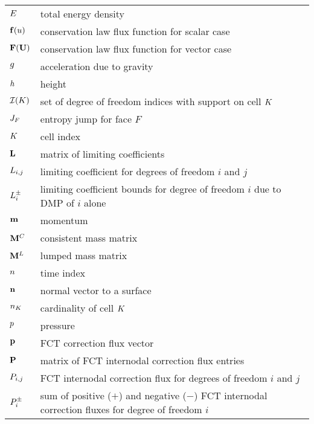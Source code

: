 \begin{center}
\begin{longtable}{l p{4.8in}}
$E$     & total energy density\\
$\mathbf{f}(u)$  & conservation law flux function for scalar case\\
$\consfluxvector$  & conservation law flux function for vector case\\
$g$         & acceleration due to gravity\\
$h$          & height\\
$\mathcal{I}(K)$ & set of degree of freedom indices with support on
                             cell $K$\\
$J_F$ & entropy jump for face $F$\\
$K$       & cell index\\

$\mathbf{L}$   & matrix of limiting coefficients\\
$L_{i,j}$ & limiting coefficient for degrees of freedom $i$
                         and $j$\\
$L^\pm_i$ & limiting coefficient bounds for degree of freedom $i$
                         due to DMP of $i$ alone\\
$\mathbf{m}$        & momentum\\
$\mathbf{M}^C$ & consistent mass matrix\\
$\mathbf{M}^L$ & lumped mass matrix\\

$n$       & time index\\
$\mathbf{n}$    & normal vector to a surface\\
$n_K$ & cardinality of cell $K$\\
$p$        & pressure\\
$\mathbf{p}$ & FCT correction flux vector\\
$\correctionfluxmatrix$ & matrix of FCT internodal correction flux entries\\
$\correctionfluxij$ & FCT internodal correction flux for degrees of freedom
                      $i$ and $j$\\
$\correctionfluxsumsi$ & sum of positive ($+$) and negative ($-$) FCT internodal
                         correction fluxes for degree of freedom $i$\\


\end{longtable}
\end{center}
